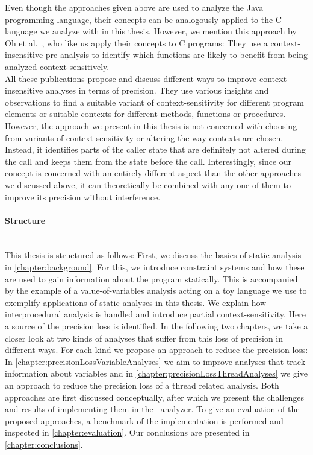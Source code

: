 Even though the approaches given above are used to analyze the Java programming language, their concepts can be analogously applied to the C language we analyze with \gob in this thesis. However, we mention this approach by Oh et al.~\parencite{oh2014selective}, who like us apply their concepts to C programs: They use a context-insensitive pre-analysis to identify which functions are likely to benefit from being analyzed context-sensitively.\\
All these publications propose and discuss different ways to improve context-insensitive analyses in terms of precision. They use various insights and observations to find a suitable variant of context-sensitivity for different program elements or suitable contexts for different methods, functions or procedures. However, the approach we present in this thesis is not concerned with choosing from variants of context-sensitivity or altering the way contexts are chosen. Instead, it identifies parts of the caller state that are definitely not altered during the call and keeps them from the state before the call. Interestingly, since our concept is concerned with an entirely different aspect than the other approaches we discussed above, it can theoretically be combined with any one of them to improve its precision without interference.

\paragraph{Structure}\mbox{}\\
This thesis is structured as follows: First, we discuss the basics of static analysis in \autoref{chapter:background}. For this, we introduce constraint systems and how these are used to gain information about the program statically. This is accompanied by the example of a value-of-variables analysis acting on a toy language we use to exemplify applications of static analyses in this thesis. We explain how interprocedural analysis is handled and introduce partial context-sensitivity. Here a source of the precision loss is identified. In the following two chapters, we take a closer look at two kinds of analyses that suffer from this loss of precision in different ways. For each kind we propose an approach to reduce the precision loss: In \autoref{chapter:precisionLossVariableAnalyses} we aim to improve analyses that track information about variables and in \autoref{chapter:precisionLossThreadAnalyses} we give an approach to reduce the precision loss of a thread related analysis. Both approaches are first discussed conceptually, after which we present the challenges and results of implementing them in the \gob\ analyzer. To give an evaluation of the proposed approaches, a benchmark of the implementation is performed and inspected in \autoref{chapter:evaluation}. Our conclusions are presented in \autoref{chapter:conclusions}.


